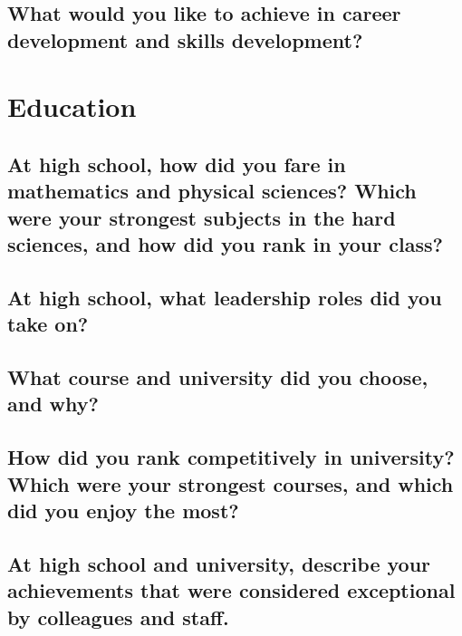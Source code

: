 \documentclass{article}
\begin{document}
\subsection{What would you like to achieve in career development and skills development?}

\section{Education}
\subsection{At high school, how did you fare in mathematics and physical sciences? Which were your strongest subjects in the hard sciences, and how did you rank in your class?}
\subsection{At high school, what leadership roles did you take on?}
\subsection{What course and university did you choose, and why?}
\subsection{How did you rank competitively in university? Which were your strongest courses, and which did you enjoy the most?}
\subsection{At high school and university, describe your achievements that were considered exceptional by colleagues and staff.}
% 
\end{document}
